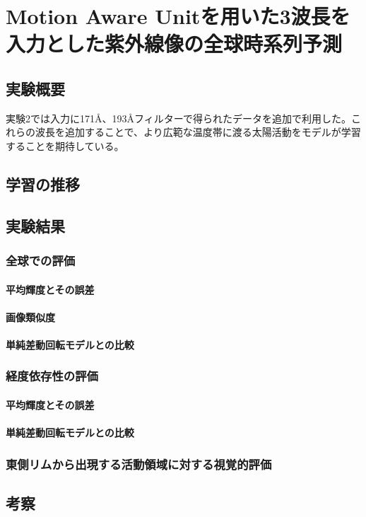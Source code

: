 \chapter{Motion Aware Unitを用いた3波長を入力とした紫外線像の全球時系列予測}
  \section{実験概要}
  実験2では入力に171Å、193Åフィルターで得られたデータを追加で利用した。これらの波長を追加することで、より広範な温度帯に渡る太陽活動をモデルが学習することを期待している。
  \section{学習の推移}
  \section{実験結果}
    \subsection{全球での評価}
      \subsubsection{平均輝度とその誤差}
      \subsubsection{画像類似度}
      \subsubsection{単純差動回転モデルとの比較}
      \subsection{経度依存性の評価}
        \subsubsection{平均輝度とその誤差}
        \subsubsection{単純差動回転モデルとの比較}
    \subsection{東側リムから出現する活動領域に対する視覚的評価}
  \section{考察}
